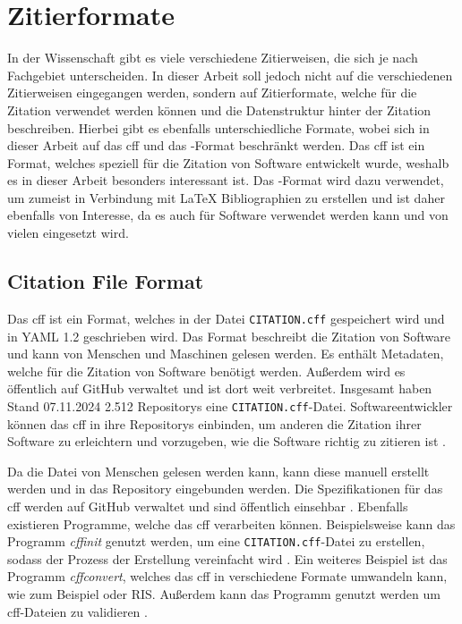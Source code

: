 \section{Zitierformate}
\label{sec:zitierformate}
In der Wissenschaft gibt es viele verschiedene Zitierweisen, die sich je nach Fachgebiet unterscheiden.
In dieser Arbeit soll jedoch nicht auf die verschiedenen Zitierweisen eingegangen werden, sondern auf Zitierformate, welche für die Zitation verwendet werden können und die Datenstruktur hinter der Zitation beschreiben.
Hierbei gibt es ebenfalls unterschiedliche Formate, wobei sich in dieser Arbeit auf das \gls{cff} und das -Format beschränkt werden.
Das \gls{cff} ist ein Format, welches speziell für die Zitation von Software entwickelt wurde, weshalb es in dieser Arbeit besonders interessant ist.
Das -Format wird dazu verwendet, um zumeist in Verbindung mit \LaTeX{} Bibliographien zu erstellen und ist daher ebenfalls von Interesse, da es auch für Software verwendet werden kann und von vielen eingesetzt wird.

\subsection{Citation File Format}
\label{subsec:citation-file-format}
Das \gls{cff} ist ein Format, welches in der Datei \texttt{CITATION.cff} gespeichert wird und in YAML 1.2 geschrieben wird. 
Das Format beschreibt die Zitation von Software und kann von Menschen und Maschinen gelesen werden.
Es enthält Metadaten, welche für die Zitation von Software benötigt werden.
Außerdem wird es öffentlich auf GitHub verwaltet und ist dort weit verbreitet.
Insgesamt haben Stand 07.11.2024 2.512 Repositorys eine \texttt{CITATION.cff}-Datei.
Softwareentwickler können das \gls{cff} in ihre Repositorys einbinden, um anderen die Zitation ihrer Software zu erleichtern und vorzugeben, wie die Software richtig zu zitieren ist \autocite{druskat_citation_2021}.

Da die Datei von Menschen gelesen werden kann, kann diese manuell erstellt werden und in das Repository eingebunden werden.
Die Spezifikationen für das \gls{cff} werden auf GitHub verwaltet und sind öffentlich einsehbar \autocite{druskat_citation_2021}.
Ebenfalls existieren Programme, welche das \gls{cff} verarbeiten können.
Beispielsweise kann das Programm \emph{cffinit} genutzt werden, um eine \texttt{CITATION.cff}-Datei zu erstellen, sodass der Prozess der Erstellung vereinfacht wird \autocite{spaaks_cffinit_2023}.
Ein weiteres Beispiel ist das Programm \emph{cffconvert}, welches das \gls{cff} in verschiedene Formate umwandeln kann, wie zum Beispiel  oder RIS.
Außerdem kann das Programm genutzt werden um \gls{cff}-Dateien zu validieren \autocite{spaaks_cffconvert_2021}.

